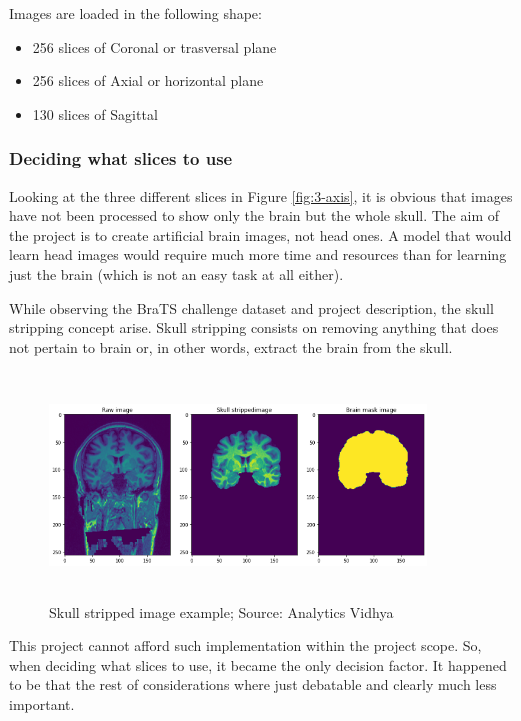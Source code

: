 Images are loaded in the following shape:

\begin{itemize}
    \item 256 slices of Coronal or trasversal plane 
    \item 256 slices of Axial or horizontal plane
    \item 130 slices of Sagittal
\end{itemize}

\subsubsection*{Deciding what slices to use}

Looking at the three different slices in Figure \ref{fig:3-axis}, it is obvious that images have not been processed to show only the brain but the whole skull. The aim of the project is to create artificial brain images, not head ones. A model that would learn head images would require much more time and resources than for learning just the brain (which is not an easy task at all either).

While observing the BraTS \cite{brats} challenge dataset and project description, the skull stripping concept arise. Skull stripping consists on removing anything that does not pertain to brain or, in other words, extract the brain from the skull. 

\begin{figure}[ht]
    \centering
    \includegraphics[width = 10cm, height = 6cm]{images/skull-stripped.png}
    \caption[Skull stripped image example]{Skull stripped image example; Source: Analytics Vidhya \cite{skullstripping} }
    \label{fig:skullstripped}
\end{figure}

This project cannot afford such implementation within the project scope. So, when deciding what slices to use, it became the only decision factor. It happened to be that the rest of considerations where just debatable and clearly much less important.

